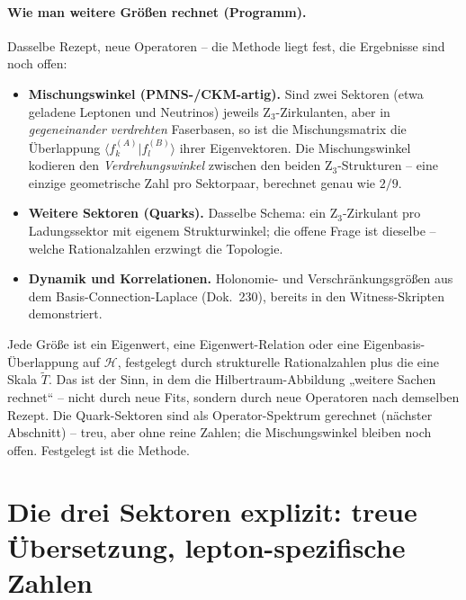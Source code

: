 \paragraph{Wie man weitere Größen rechnet (Programm).}
Dasselbe Rezept, neue Operatoren -- die Methode liegt fest, die Ergebnisse sind
noch offen:
\begin{itemize}
  \item \textbf{Mischungswinkel (PMNS-/CKM-artig).} Sind zwei Sektoren (etwa
        geladene Leptonen und Neutrinos) jeweils Z$_3$-Zirkulanten, aber in
        \emph{gegeneinander verdrehten} Faserbasen, so ist die Mischungsmatrix
        die Überlappung $\langle f_k^{(A)}|f_l^{(B)}\rangle$ ihrer
        Eigenvektoren. Die Mischungswinkel kodieren den
        \emph{Verdrehungswinkel} zwischen den beiden Z$_3$-Strukturen -- eine
        einzige geometrische Zahl pro Sektorpaar, berechnet genau wie $2/9$.
  \item \textbf{Weitere Sektoren (Quarks).} Dasselbe Schema: ein
        Z$_3$-Zirkulant pro Ladungssektor mit eigenem Strukturwinkel; die offene
        Frage ist dieselbe -- welche Rationalzahlen erzwingt die Topologie.
  \item \textbf{Dynamik und Korrelationen.} Holonomie- und
        Verschränkungsgrößen aus dem Basis-Connection-Laplace (Dok.~230),
        bereits in den Witness-Skripten demonstriert.
\end{itemize}

\begin{important}
Jede Größe ist ein Eigenwert, eine Eigenwert-Relation oder eine
Eigenbasis-Überlappung auf $\mathcal{H}$, festgelegt durch strukturelle
Rationalzahlen plus die eine Skala $\tilde T$. Das ist der Sinn, in dem die
Hilbertraum-Abbildung „weitere Sachen rechnet`` -- nicht durch neue Fits,
sondern durch neue Operatoren nach demselben Rezept. Die Quark-Sektoren sind
als Operator-Spektrum gerechnet (nächster Abschnitt) -- treu, aber ohne reine
Zahlen; die Mischungswinkel bleiben noch offen. Festgelegt ist die Methode.
\end{important}

\section{Die drei Sektoren explizit: treue Übersetzung, lepton-spezifische Zahlen}

